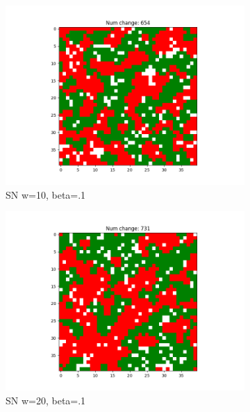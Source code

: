 \documentclass[11pt]{article}
\begin{document}
\begin{figure}[h]
\begin{subfigure}{0.14\textwidth}
			\includegraphics[width=\linewidth]{final_cluster_w10b10.png}
			\caption{\centering SN w=10, beta=.1}
			\label{sn_finalw10b10}
		\end{subfigure}\hfill
		\begin{subfigure}{0.14\textwidth}
			\includegraphics[width=\linewidth]{final_cluster_w20b10.png}
			\caption{\centering SN w=20, beta=.1}
			\label{sn_finalw20b10}
		\end{subfigure}\hfill
		\begin{subfigure}{0.14\textwidth}

\end{subfigure}
\end{figure}
\end{document}
